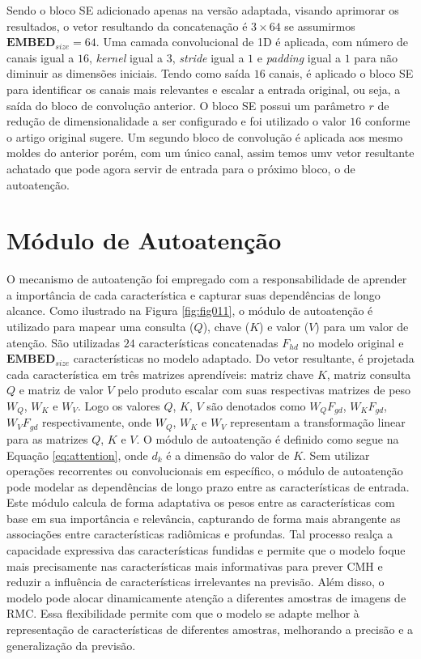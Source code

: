 Sendo o bloco \gls{SE} adicionado apenas na versão adaptada, visando aprimorar os resultados, o vetor resultando da concatenação é $3\times64$ se assumirmos $\textbf{EMBED}_{size} = 64$. Uma camada convolucional de 1D é aplicada, com número de canais igual a $16$, \textit{kernel} igual a 3, \textit{stride} igual a $1$ e \textit{padding} igual a $1$ para não diminuir as dimensões iniciais. Tendo como saída $16$ canais, é aplicado o bloco \gls{SE} para identificar os canais mais relevantes e escalar a entrada original, ou seja, a saída do bloco de convolução anterior. O bloco \gls{SE} possui um parâmetro $r$ de redução de dimensionalidade a ser configurado e foi utilizado o valor $16$ conforme o artigo original sugere. Um segundo bloco de convolução é aplicada aos mesmo moldes do anterior porém, com um único canal, assim temos umv vetor resultante achatado que pode agora servir de entrada para o próximo bloco, o de autoatenção.

\section{Módulo de Autoatenção}
\label{subsec:cap4_mod_self_attnn}

O mecanismo de autoatenção foi empregado com a responsabilidade de aprender a importância de cada característica e capturar suas dependências de longo alcance. Como ilustrado na Figura \ref{fig:fig011}, o módulo de autoatenção é utilizado para mapear uma consulta ($Q$), chave ($K$) e valor ($V$) para um valor de atenção. São utilizadas $24$ características concatenadas $F_{hd}$ no modelo original e $\textbf{EMBED}_{size}$ características no modelo adaptado. Do vetor resultante, é projetada cada característica em três matrizes aprendíveis: matriz chave $K$, matriz consulta $Q$ e matriz de valor $V$ pelo produto escalar com suas respectivas matrizes de peso $W_{Q}$, $W_{K}$ e $W_{V}$. Logo os valores $Q$, $K$, $V$ são denotados como $W_{Q}F_{gd}$, $W_{K}F_{gd}$, $W_{V}F_{gd}$ respectivamente, onde $W_{Q}$, $W_{K}$ e $W_{V}$ representam a transformação linear para as matrizes $Q$, $K$ e $V$. O módulo de autoatenção é definido como segue na Equação \ref{eq:attention}, onde $d_{k}$ é a dimensão do valor de $K$. Sem utilizar operações recorrentes ou convolucionais em específico, o módulo de autoatenção pode modelar as dependências de longo prazo entre as características de entrada.
Este módulo calcula de forma adaptativa os pesos entre as características com base em sua importância e relevância, capturando de forma mais abrangente as associações entre características radiômicas e profundas. Tal processo realça a capacidade expressiva das características fundidas e permite que o modelo foque mais precisamente nas características mais informativas para prever \gls{CMH} e reduzir a influência de características irrelevantes na previsão. Além disso, o modelo pode alocar dinamicamente atenção a diferentes amostras de imagens de \gls{RMC}. Essa flexibilidade permite com que o modelo se adapte melhor à representação de características de diferentes amostras, melhorando a precisão e a generalização da previsão.

